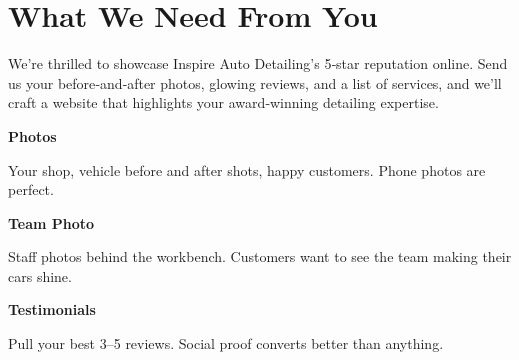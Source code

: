 \documentclass[11pt,letterpaper]{article}
\begin{document}
\vspace{0.2em}

\section*{What We Need From You}

We’re thrilled to showcase Inspire Auto Detailing’s 5‑star reputation online. Send us your before‑and‑after photos, glowing reviews, and a list of services, and we’ll craft a website that highlights your award‑winning detailing expertise.

\vspace{0.12em}

\noindent\begin{minipage}[t]{0.48\textwidth}
\begin{tcolorbox}[colframe=accent-teal, boxrule=1pt, left=0.7em, right=0.7em, top=0.5em, bottom=0.5em, arc=4pt, boxsep=0pt]
{\bfseries\small\color{accent-teal}Photos}

\vspace{0.15em}

{\small Your shop, vehicle before and after shots, happy customers. Phone photos are perfect.}
\end{tcolorbox}

\vspace{0.1em}

\begin{tcolorbox}[colframe=accent-teal, boxrule=1pt, left=0.7em, right=0.7em, top=0.5em, bottom=0.5em, arc=4pt, boxsep=0pt]
{\bfseries\small\color{accent-teal}Team Photo}

\vspace{0.15em}

{\small Staff photos behind the workbench. Customers want to see the team making their cars shine.}
\end{tcolorbox}

\vspace{0.1em}

\begin{tcolorbox}[colframe=accent-teal, boxrule=1pt, left=0.7em, right=0.7em, top=0.5em, bottom=0.5em, arc=4pt, boxsep=0pt]
{\bfseries\small\color{accent-teal}Testimonials}

\vspace{0.15em}

{\small Pull your best 3--5 reviews. Social proof converts better than anything.}
\end{tcolorbox}
\end{minipage}
\end{document}
